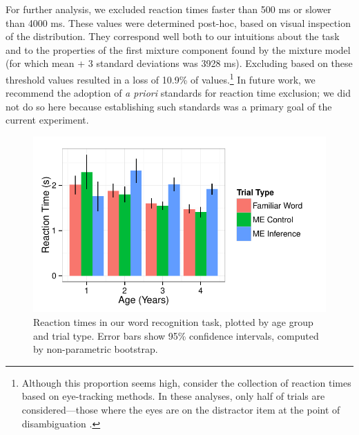 \documentclass[man,noapacite]{apa2}
\begin{document}
For further analysis, we excluded reaction times faster than 500 ms or slower than 4000 ms. These values were determined post-hoc, based on visual inspection of the distribution. They correspond well both to our intuitions about the task and to the properties of the first mixture component found by the mixture model (for which mean + 3 standard deviations was 3928 ms). Excluding based on these threshold values resulted in a loss of 10.9\% of values.\footnote{Although this proportion seems high, consider the collection of reaction times based on eye-tracking methods. In these analyses, only half of trials are considered---those where the eyes are on the distractor item at the point of disambiguation \cite{fernald2008}.} In future work, we recommend the adoption of {\it a priori} standards for reaction time exclusion; we did not do so here because establishing such standards was a primary goal of the current experiment. 

\begin{figure}[t] 
  \begin{center} 
    \includegraphics[width=5in]{figures/rt.pdf} 
    \caption{\label{fig:rt} Reaction times in our word recognition task, plotted by age group and trial type. Error bars show 95\% confidence intervals, computed by non-parametric bootstrap.}
  \end{center} 
\end{figure}
\end{document}
